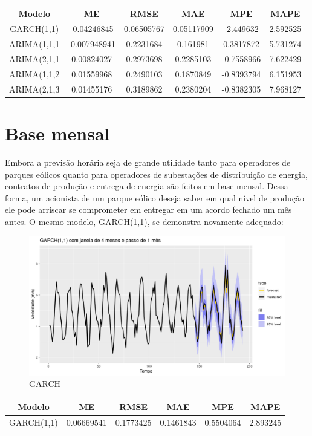 \documentclass[
	12pt,				%
	openright,			%
	oneside,			%
	a4paper,			%
	english,			%
	french,				%
	spanish,			%
	brazil				%
	]{abntex2}
\begin{document}
\begin{center}
\begin{tabular}{ |c|c|c|c|c|c| } 
\hline
Modelo&ME&RMSE&MAE&MPE&MAPE \\
\hline
GARCH(1,1)&-0.04246845&0.06505767&0.05117909&-2.449632&2.592525 \\
\hline
ARIMA(1,1,1&-0.007948941&0.2231684&0.161981&0.3817872&5.731274 \\
\hline
ARIMA(2,1,1&0.00824027&0.2973698&0.2285103&-0.7558966&7.622429 \\
\hline
ARIMA(1,1,2&0.01559968&0.2490103&0.1870849&-0.8393794&6.151953 \\
\hline
ARIMA(2,1,3&0.01455176&0.3189862&0.2380204&-0.8382305&7.968127 \\
\hline
\end{tabular}
\end{center}

\section{Base mensal}

Embora a previsão horária seja de grande utilidade tanto para operadores de parques eólicos quanto para operadores de subestações de distribuição de energia, contratos de produção e entrega de energia são feitos em base mensal. Dessa forma, um acionista de um parque eólico deseja saber em qual nível de produção ele pode arriscar se comprometer em entregar em um acordo fechado um mês antes. O mesmo modelo, GARCH(1,1), se demonstra novamente adequado:

\begin{figure}[h]
    \centering
	\includegraphics[width=\textwidth]{garch_month}
	\caption{GARCH}
\end{figure}
\FloatBarrier

\begin{center}
\begin{tabular}{ |c|c|c|c|c|c| } 
\hline
Modelo&ME&RMSE&MAE&MPE&MAPE \\
\hline
GARCH(1,1)&0.06669541&0.1773425&0.1461843&0.5504064&2.893245\\
\hline
\end{tabular}
\end{center}
\end{document}
